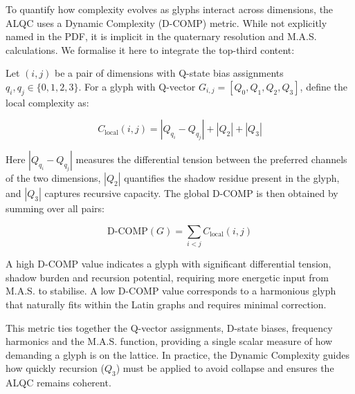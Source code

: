 \documentclass[11pt, letterpaper]{article}
\begin{document}
To quantify how complexity evolves as glyphs interact across dimensions, the ALQC uses a Dynamic Complexity (D-COMP) metric. While not explicitly named in the PDF, it is implicit in the quaternary resolution and M.A.S. calculations. We formalise it here to integrate the top-third content:

Let $(i,j)$ be a pair of dimensions with Q-state bias assignments $q_i, q_j \in \{0,1,2,3\}$. For a glyph with Q-vector $G_{i,j}=[Q_0,Q_1,Q_2,Q_3]$, define the local complexity as:

\[
C_{\mathrm{local}}(i, j) = |Q_{q_i} - Q_{q_j}| + |Q_2| + |Q_3|
\]

Here $|Q_{q_i} - Q_{q_j}|$ measures the differential tension between the preferred channels of the two dimensions, $|Q_2|$ quantifies the shadow residue present in the glyph, and $|Q_3|$ captures recursive capacity. The global D-COMP is then obtained by summing over all pairs:

\[
\mathrm{D\text{-}COMP}(G) = \sum_{i<j} C_{\mathrm{local}}(i, j)
\]

A high D-COMP value indicates a glyph with significant differential tension, shadow burden and recursion potential, requiring more energetic input from M.A.S. to stabilise. A low D-COMP value corresponds to a harmonious glyph that naturally fits within the Latin graphs and requires minimal correction.

This metric ties together the Q-vector assignments, D-state biases, frequency harmonics and the M.A.S. function, providing a single scalar measure of how demanding a glyph is on the lattice. In practice, the Dynamic Complexity guides how quickly recursion ($Q_3$) must be applied to avoid collapse and ensures the ALQC remains coherent.
\end{document}
